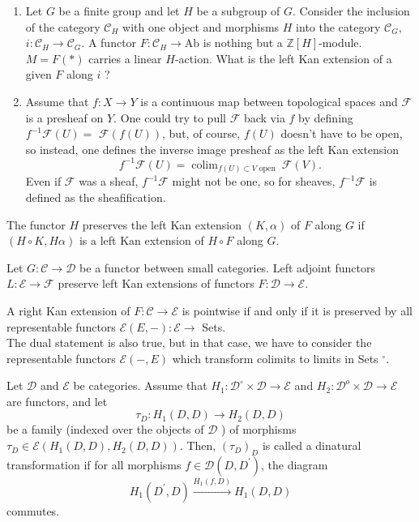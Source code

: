 \begin{example}
    \begin{enumerate}
        
        \item Let $G$ be a finite group and let $H$ be a subgroup of $G$. Consider the inclusion of the category $\mathcal{C}_H$ with one object and morphisms $H$ into the category $\mathcal{C}_G$, $i: \mathcal{C}_H \rightarrow \mathcal{C}_G$. A functor $F: \mathcal{C}_H \rightarrow \mathrm{Ab}$ is nothing but a $\mathbb{Z}[H]$-module. $M=F(*)$ carries a linear $H$-action. What is the left Kan extension of a given $F$ along $i$ ?
        \item Assume that $f: X \rightarrow Y$ is a continuous map between topological spaces and $\mathcal{F}$ is a presheaf on $Y$. One could try to pull $\mathcal{F}$ back via $f$ by defining $f^{-1} \mathcal{F}(U)=$ $\mathcal{F}(f(U))$, but, of course, $f(U)$ doesn't have to be open, so instead, one defines the inverse image presheaf as the left Kan extension
        $$
        f^{-1} \mathcal{F}(U)=\operatorname{colim}_{f(U) \subset V \text { open }} \mathcal{F}(V) .
        $$
        Even if $\mathcal{F}$ was a sheaf, $f^{-1} \mathcal{F}$ might not be one, so for sheaves, $f^{-1} \mathcal{F}$ is defined as the sheafification.
    \end{enumerate}
\end{example}


The functor $H$ preserves the left Kan extension $(K, \alpha)$ of $F$ along $G$ if $(H \circ K, H \alpha)$ is a left Kan extension of $H \circ F$ along $G$.

\begin{theo}
Let $G: \mathcal{C} \rightarrow \mathcal{D}$ be a functor between small categories. Left adjoint functors $L: \mathcal{E} \rightarrow \mathcal{F}$ preserve left Kan extensions of functors $F: \mathcal{D} \rightarrow \mathcal{E}$.
\end{theo}






A right Kan extension of $F: \mathcal{C} \rightarrow \mathcal{E}$ is pointwise if and only if it is preserved by all representable functors $\mathcal{E}(E,-): \mathcal{E} \rightarrow$ Sets.\\
The dual statement is also true, but in that case, we have to consider the representable functors $\mathcal{E}(-, E)$ which transform colimits to limits in Sets ${ }^{\circ}$.

Let $\mathcal{D}$ and $\mathcal{E}$ be categories. Assume that $H_1: \mathcal{D}^{\circ} \times \mathcal{D} \rightarrow \mathcal{E}$ and $H_2: \mathcal{D}^o \times \mathcal{D} \rightarrow \mathcal{E}$ are functors, and let
$$
\tau_D: H_1(D, D) \rightarrow H_2(D, D)
$$
be a family (indexed over the objects of $\mathcal{D}$ ) of morphisms $\tau_D \in \mathcal{E}\left(H_1(D, D), H_2(D, D)\right)$. Then, $\left(\tau_D\right)_D$ is called a dinatural transformation if for all morphisms $f \in \mathcal{D}\left(D, D^{\prime}\right)$, the diagram
$$
H_1\left(D^{\prime}, D\right) \xrightarrow{H_1(f, D)} H_1(D, D)
$$
commutes.

